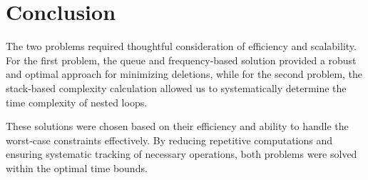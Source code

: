 \documentclass{article}
\begin{document}
\section{Conclusion}
The two problems required thoughtful consideration of efficiency and scalability. For the first problem, the queue and frequency-based solution provided a robust and optimal approach for minimizing deletions, while for the second problem, the stack-based complexity calculation allowed us to systematically determine the time complexity of nested loops.

These solutions were chosen based on their efficiency and ability to handle the worst-case constraints effectively. By reducing repetitive computations and ensuring systematic tracking of necessary operations, both problems were solved within the optimal time bounds.
\end{document}
